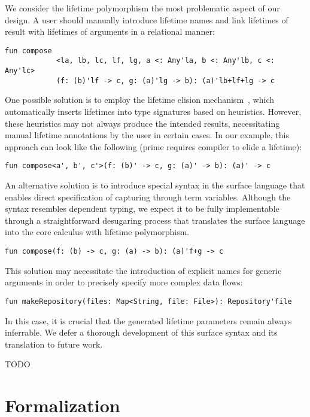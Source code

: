 \documentclass[11pt]{article}
\begin{document}
    We consider the lifetime polymorphism the most problematic aspect of our design.
    A user should manually introduce lifetime names and link lifetimes of result with lifetimes of arguments in a relational manner:
    \begin{lstlisting}[language=colang]
        fun compose
            <la, lb, lc, lf, lg, a <: Any'la, b <: Any'lb, c <: Any'lc>
            (f: (b)'lf -> c, g: (a)'lg -> b): (a)'lb+lf+lg -> c
    \end{lstlisting}

    One possible solution is to employ the lifetime elision mechanism~\cite{matsakis2014rust}, which automatically inserts lifetimes into type signatures based on heuristics.
    However, these heuristics may not always produce the intended results, necessitating manual lifetime annotations by the user in certain cases.
    In our example, this approach can look like the following (prime requires compiler to elide a lifetime):
    \begin{lstlisting}[language=colang]
        fun compose<a', b', c'>(f: (b)' -> c, g: (a)' -> b): (a)' -> c
    \end{lstlisting}

    An alternative solution is to introduce special syntax in the surface language that enables direct specification of capturing through term variables.
    Although the syntax resembles dependent typing, we expect it to be fully implementable through a straightforward desugaring process that translates the surface language into the core calculus with lifetime polymorphism.
    \begin{lstlisting}[language=colang]
        fun compose(f: (b) -> c, g: (a) -> b): (a)'f+g -> c
    \end{lstlisting}

    This solution may necessitate the introduction of explicit names for generic arguments in order to precisely specify more complex data flows:
    \begin{lstlisting}[language=colang]
        fun makeRepository(files: Map<String, file: File>): Repository'file
    \end{lstlisting}

    In this case, it is crucial that the generated lifetime parameters remain always inferrable.
    We defer a thorough development of this surface syntax and its translation to future work.

    TODO %


    \section{Formalization}
\end{document}
